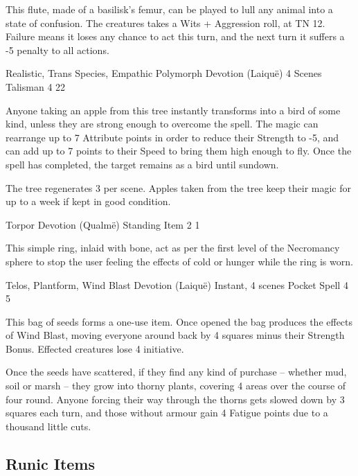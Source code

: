 \begin{multicols}{2}
This flute, made of a basilisk's femur, can be played to lull any animal into a state of confusion.
The creatures takes a Wits + Aggression roll, at TN 12.
Failure means it loses any chance to act this turn, and the next turn it suffers a -5 penalty to all actions.

	{Realistic, Trans Species, Empathic Polymorph}%
	{Devotion (Laiqu\"{e})}%
	{4 Scenes}%
	{Talisman}%
	{4}%
	{22}%

Anyone taking an apple from this tree instantly transforms into a bird of some kind, unless they are strong enough to overcome the spell.  The magic can rearrange up to 7 Attribute points in order to reduce their Strength to -5, and can add up to 7 points to their Speed to bring them high enough to fly.  Once the spell has completed, the target remains as a bird until sundown.

The tree regenerates 3 per scene.  Apples taken from the tree keep their magic for up to a week if kept in good condition.

	{Torpor}%
	{Devotion (Qualm\"{e})}%
	{Standing}%
	{Item}%
	{2}%
	{1}\label{ring_asphyxiation}%

This simple ring, inlaid with bone, act as per the first level of the Necromancy sphere to stop the user feeling the effects of cold or hunger while the ring is worn.

	{Telos, Plantform, Wind Blast}%
	{Devotion (Laiqu\"{e})}%
	{Instant, 4 scenes}%
	{Pocket Spell}%
	{4}%
	{5}%

This bag of seeds forms a one-use item.
Once opened the bag produces the effects of Wind Blast, moving everyone around back by 4 squares minus their Strength Bonus.
Effected creatures lose 4 initiative.

Once the seeds have scattered, if they find any kind of purchase -- whether mud, soil or marsh -- they grow into thorny plants, covering 4 areas over the course of four round.
Anyone forcing their way through the thorns gets slowed down by 3 squares each turn, and those without armour gain 4 Fatigue points due to a thousand little cuts.

\subsection{Runic Items}


\end{multicols}
